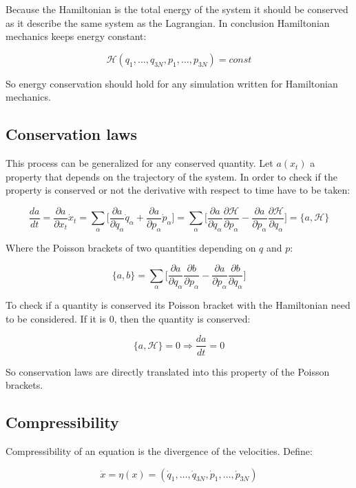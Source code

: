 	Because the Hamiltonian is the total energy of the system it should be conserved as it describe the same system as the Lagrangian.
	In conclusion Hamiltonian mechanics keeps energy constant:

	$$\mathcal{H}(q_1, \dots, q_{3N}, p_1, \dots, p_{3N}) = const$$

	So energy conservation should hold for any simulation written for Hamiltonian mechanics.

	\subsection{Conservation laws}
	This process can be generalized for any conserved quantity.
	Let $a(x_t)$ a property that depends on the trajectory of the system.
	In order to check if the property is conserved or not the derivative with respect to time have to be taken:

	$$\frac{da}{dt} = \frac{\partial a}{\partial x_t} \dot{x}_t = \sum\limits_\alpha\biggl[\frac{\partial a}{\partial q_\alpha}\dot{q}_\alpha + \frac{\partial a}{\partial p_\alpha}\dot{p}_\alpha\biggr] = \sum\limits_\alpha\biggl[\frac{\partial a}{\partial q_\alpha}\frac{\partial\mathcal{H}}{\partial p_\alpha} - \frac{\partial a}{\partial p_\alpha}\frac{\partial\mathcal{H}}{\partial q_\alpha}\biggr] = \{a, \mathcal{H}\}$$

	Where the Poisson brackets of two quantities depending on $q$ and $p$:

	$$\{a, b\} = \sum\limits_\alpha\biggl[\frac{\partial a}{\partial q_\alpha}\frac{\partial b}{\partial p_\alpha} - \frac{\partial a}{\partial p_\alpha}\frac{\partial b}{\partial q_\alpha}\biggr]$$

	To check if a quantity is conserved its Poisson bracket with the Hamiltonian need to be considered.
	If it is $0$, then the quantity is conserved:

	$$\{a, \mathcal{H}\} = 0\Rightarrow\frac{da}{dt} = 0$$

	So conservation laws are directly translated into this property of the Poisson brackets.

	\subsection{Compressibility}
	Compressibility of an equation is the divergence of the velocities.
	Define:

	$$\dot{x} = \eta(x) = (\dot{q}_1, \dots, \dot{q}_{3N}, \dot{p}_1, \dots, \dot{p}_{3N})$$

